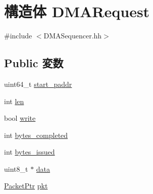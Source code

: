 \hypertarget{structDMARequest}{
\section{構造体 DMARequest}
\label{structDMARequest}
}


{\ttfamily \#include $<$DMASequencer.hh$>$}\subsection*{Public 変数}
\begin{DoxyCompactItemize}
\item 
uint64\_\-t \hyperlink{structDMARequest_aa96199a298e3cb816b3b9fd242a60c91}{start\_\-paddr}
\item 
int \hyperlink{structDMARequest_afed088663f8704004425cdae2120b9b3}{len}
\item 
bool \hyperlink{structDMARequest_ab4d8d1259f524270d625ab8933700d27}{write}
\item 
int \hyperlink{structDMARequest_aecb0741320aa86a826f0b33765e6feec}{bytes\_\-completed}
\item 
int \hyperlink{structDMARequest_ad8a44f2c8084316e8692a1a9abe33486}{bytes\_\-issued}
\item 
uint8\_\-t $\ast$ \hyperlink{structDMARequest_abe222f6d3581e7920dcad5306cc906a8}{data}
\item 
\hyperlink{classPacket}{PacketPtr} \hyperlink{structDMARequest_a3a891bc2a0fcbe6be5297077d94e2df7}{pkt}
\end{DoxyCompactItemize}


